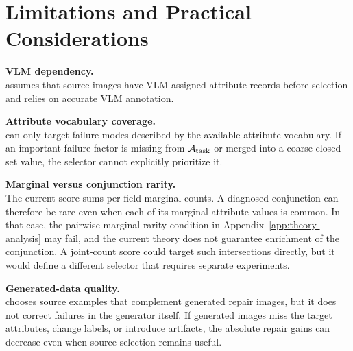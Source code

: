 \section{Limitations and Practical Considerations}
\label{app:limitations}

\textbf{VLM dependency.}\\
\model assumes that source images have VLM-assigned attribute records before selection and relies on accurate VLM annotation.

\vspace{0.5em}
\textbf{Attribute vocabulary coverage.}\\
\model can only target failure modes described by the available attribute vocabulary. If an important failure factor is missing from $\mathcal{A}_{\mathrm{task}}$ or merged into a coarse closed-set value, the selector cannot explicitly prioritize it.

\vspace{0.5em}
\textbf{Marginal versus conjunction rarity.}\\
The current score sums per-field marginal counts. A diagnosed conjunction can therefore be rare even when each of its marginal attribute values is common. In that case, the pairwise marginal-rarity condition in Appendix~\ref{app:theory-analysis} may fail, and the current theory does not guarantee enrichment of the conjunction. A joint-count score could target such intersections directly, but it would define a different selector that requires separate experiments.

\vspace{0.5em}
\textbf{Generated-data quality.}\\
\model chooses source examples that complement generated repair images, but it does not correct failures in the generator itself. If generated images miss the target attributes, change labels, or introduce artifacts, the absolute repair gains can decrease even when source selection remains useful.

\clearpage
